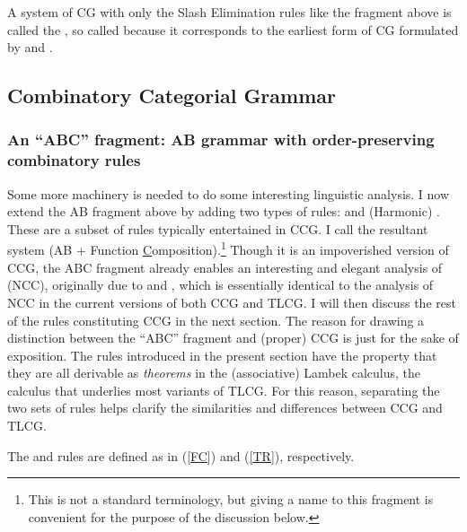 \documentclass[output=paper
                ,modfonts
                ,nonflat
	        ,collection
	        ,collectionchapter
	        ,collectiontoclongg
 	        ,biblatex
                ,babelshorthands
                ,newtxmath
                ,draftmode
                ,colorlinks, citecolor=brown
]{./langsci/langscibook}
\begin{document}
\noindent
A system of CG with only the Slash Elimination rules like the fragment
above is called the , so called because it corresponds to
the earliest form of CG formulated by
\citet{Ajdukiewicz35a-u} and \citet{bar-hillel53}.


\subsection{Combinatory Categorial Grammar \label{sec:CCG}}

\subsubsection{An ``ABC'' fragment: AB grammar with order-preserving combinatory rules \label{preCCG}}

Some more machinery is needed to do some interesting linguistic analysis.
I now extend the AB fragment above by adding two types of
rules:  and (Harmonic) . These are
a subset of rules typically entertained in CCG. I call the resultant
system  (AB + Function
\underline{C}omposition).\footnote{This is not a standard terminology,
  but giving a name to this fragment is convenient for the purpose of the
discussion below.} Though it is an impoverished version of CCG, the
ABC fragment 
already enables an interesting and elegant analysis of
 (NCC), originally due to \citet{Steedman85a-u} and
\citet{Dowty88a-u}, which is essentially identical to the analysis of NCC in
the current versions of both CCG and TLCG. I will then discuss the
rest of the rules constituting CCG in the next section. The reason for
drawing a distinction between the ``ABC'' fragment and (proper) CCG is
just for the sake of exposition. The rules introduced in the present
section have the property that they are all derivable as \emph{theorems} in
the (associative) Lambek calculus, the calculus that underlies most
variants of TLCG. For this reason, separating the two sets of rules
helps clarify the similarities and differences between CCG and TLCG.

The  and  rules are defined as in
(\ref{FC}) and (\ref{TR}), respectively. 
\end{document}
